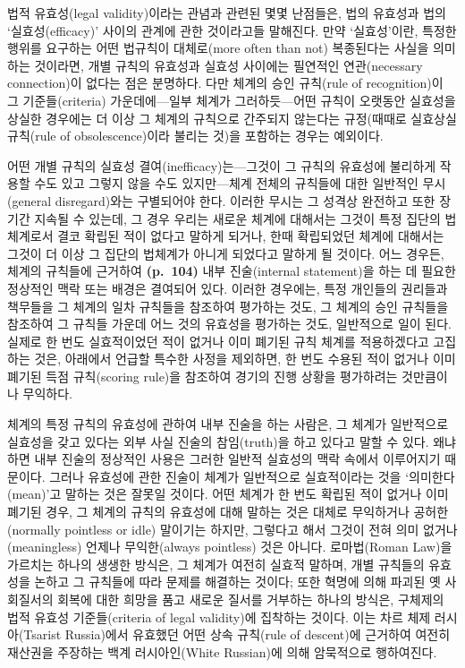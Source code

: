 법적 유효성(legal validity)이라는 관념과 관련된 몇몇 난점들은, 법의
유효성과 법의 ‘실효성(efficacy)’ 사이의 관계에 관한 것이라고들 말해진다.
만약 ‘실효성’이란, 특정한 행위를 요구하는 어떤 법규칙이 대체로(more
often than not) 복종된다는 사실을 의미하는 것이라면, 개별 규칙의
유효성과  실효성 사이에는 필연적인 연관(necessary
connection)이 없다는 점은 분명하다. 다만 체계의 승인 규칙(rule of
recognition)이 그 기준들(criteria) 가운데에---일부 체계가
그러하듯---어떤 규칙이 오랫동안 실효성을 상실한 경우에는 더 이상 그
체계의 규칙으로 간주되지 않는다는 규정(때때로 실효상실 규칙(rule of
obsolescence)이라 불리는 것)을 포함하는 경우는 예외이다.

어떤 개별 규칙의 실효성 결여(inefficacy)는---그것이 그 규칙의 유효성에
불리하게 작용할 수도 있고 그렇지 않을 수도 있지만---체계 전체의 규칙들에
대한 일반적인 무시(general disregard)와는 구별되어야 한다. 이러한 무시는
그 성격상 완전하고 또한 장기간 지속될 수 있는데, 그 경우 우리는 새로운
체계에 대해서는 그것이 특정 집단의 법체계로서 결코 확립된 적이 없다고
말하게 되거나, 한때 확립되었던 체계에 대해서는 그것이 더 이상 그 집단의
법체계가 아니게 되었다고 말하게 될 것이다. 어느 경우든, 체계의 규칙들에
근거하여 \textbf{(p.~104)} 내부 진술(internal statement)을 하는 데
필요한 정상적인 맥락 또는 배경은 결여되어 있다. 이러한 경우에는, 특정
개인들의 권리들과 책무들을 그 체계의 일차 규칙들을 참조하여 평가하는
것도, 그 체계의 승인 규칙들을 참조하여 그 규칙들 가운데 어느 것의
유효성을 평가하는 것도, 일반적으로  일이 된다.
실제로 한 번도 실효적이었던 적이 없거나 이미 폐기된 규칙 체계를
적용하겠다고 고집하는 것은, 아래에서 언급할 특수한 사정을 제외하면, 한
번도 수용된 적이 없거나 이미 폐기된 득점 규칙(scoring rule)을 참조하여
경기의 진행 상황을 평가하려는 것만큼이나 무익하다.

체계의 특정 규칙의 유효성에 관하여 내부 진술을 하는 사람은, 그 체계가
일반적으로 실효성을 갖고 있다는 외부 사실 진술의 참임(truth)을
하고 있다고 말할 수 있다. 왜냐하면 내부 진술의
정상적인 사용은 그러한 일반적 실효성의 맥락 속에서 이루어지기 때문이다.
그러나 유효성에 관한 진술이 체계가 일반적으로 실효적이라는 것을
‘의미한다(mean)’고 말하는 것은 잘못일 것이다. 어떤 체계가 한 번도 확립된
적이 없거나 이미 폐기된 경우, 그 체계의 규칙의 유효성에 대해 말하는 것은
대체로 무익하거나 공허한(normally pointless or idle) 말이기는 하지만,
그렇다고 해서 그것이 전혀 의미 없거나(meaningless) 언제나 무익한(always
pointless) 것은 아니다. 로마법(Roman Law)을 가르치는 하나의 생생한
방식은, 그 체계가 여전히 실효적 말하며, 개별
규칙들의 유효성을 논하고 그 규칙들에 따라 문제를 해결하는 것이다; 또한
혁명에 의해 파괴된 옛 사회질서의 회복에 대한 희망을 품고 새로운 질서를
거부하는 하나의 방식은, 구체제의 법적 유효성 기준들(criteria of legal
validity)에 집착하는 것이다. 이는 차르 체제 러시아(Tsarist Russia)에서
유효했던 어떤 상속 규칙(rule of descent)에 근거하여 여전히 재산권을
주장하는 백계 러시아인(White Russian)에 의해 암묵적으로 행하여진다.

